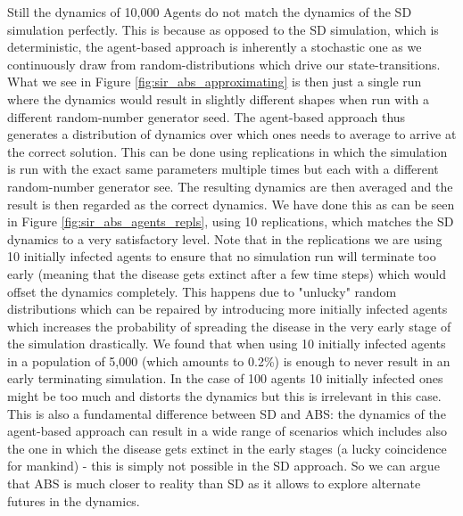 Still the dynamics of 10,000 Agents do not match the dynamics of the SD simulation perfectly. This is because as opposed to the SD simulation, which is deterministic, the agent-based approach is inherently a stochastic one as we continuously draw from random-distributions which drive our state-transitions. What we see in Figure \ref{fig:sir_abs_approximating} is then just a single run where the dynamics would result in slightly different shapes when run with a different random-number generator seed. The agent-based approach thus generates a distribution of dynamics over which ones needs to average to arrive at the correct solution. This can be done using replications in which the simulation is run with the exact same parameters multiple times but each with a different random-number generator see. The resulting dynamics are then averaged and the result is then regarded as the correct dynamics.
We have done this as can be seen in Figure \ref{fig:sir_abs_agents_repls}, using 10 replications, which matches the SD dynamics to a very satisfactory level. Note that in the replications we are using 10 initially infected agents to ensure that no simulation run will terminate too early (meaning that the disease gets extinct after a few time steps) which would offset the dynamics completely. This happens due to "unlucky" random distributions which can be repaired by introducing more initially infected agents which increases the probability of spreading the disease in the very early stage of the simulation drastically. We found that when using 10 initially infected agents in a population of 5,000 (which amounts to 0.2\%) is enough to never result in an early terminating simulation. In the case of 100 agents 10 initially infected ones might be too much and distorts the dynamics but this is irrelevant in this case. This is also a fundamental difference between SD and ABS: the dynamics of the agent-based approach can result in a wide range of scenarios which includes also the one in which the disease gets extinct in the early stages (a lucky coincidence for mankind) - this is simply not possible in the SD approach. So we can argue that ABS is much closer to reality than SD as it allows to explore alternate futures in the dynamics.

